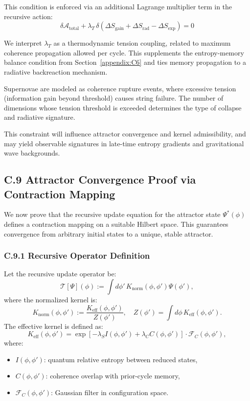 This condition is enforced via an additional Lagrange multiplier term in the recursive action:
\begin{equation}
\delta \mathcal{A}_{\text{total}} + \lambda_T \, \delta\left( \Delta S_{\text{gain}} + \Delta S_{\text{rad}} - \Delta S_{\text{exp}} \right) = 0
\end{equation}

We interpret \( \lambda_T \) as a thermodynamic tension coupling, related to maximum coherence propagation allowed per cycle. This supplements the entropy-memory balance condition from Section~\ref{appendix:C6} and ties memory propagation to a radiative backreaction mechanism.

Supernovae are modeled as coherence rupture events, where excessive tension (information gain beyond threshold) causes string failure. The number of dimensions whose tension threshold is exceeded determines the type of collapse and radiative signature.

This constraint will influence attractor convergence and kernel admissibility, and may yield observable signatures in late-time entropy gradients and gravitational wave backgrounds.
\subsection*{C.9 Attractor Convergence Proof via Contraction Mapping}
\label{appendix:C9}

We now prove that the recursive update equation for the attractor state \( \Psi^*(\phi) \) defines a contraction mapping on a suitable Hilbert space. This guarantees convergence from arbitrary initial states to a unique, stable attractor.

\subsubsection*{C.9.1 Recursive Operator Definition}

Let the recursive update operator be:
\begin{equation}
\mathcal{T}[\Psi](\phi) := \int d\phi' \, K_{\text{norm}}(\phi, \phi') \Psi(\phi'),
\end{equation}
where the normalized kernel is:
\begin{equation}
K_{\text{norm}}(\phi, \phi') := \frac{K_{\text{eff}}(\phi, \phi')}{Z(\phi')}, \quad Z(\phi') = \int d\phi \, K_{\text{eff}}(\phi, \phi').
\end{equation}
The effective kernel is defined as:
\begin{equation}
K_{\text{eff}}(\phi, \phi') = \exp\left[ -\lambda_S I(\phi, \phi') + \lambda_C C(\phi, \phi') \right] \cdot \mathcal{F}_C(\phi, \phi'),
\end{equation}
where:
\begin{itemize}
    \item \( I(\phi, \phi') \): quantum relative entropy between reduced states,
    \item \( C(\phi, \phi') \): coherence overlap with prior-cycle memory,
    \item \( \mathcal{F}_C(\phi, \phi') \): Gaussian filter in configuration space.
\end{itemize}

